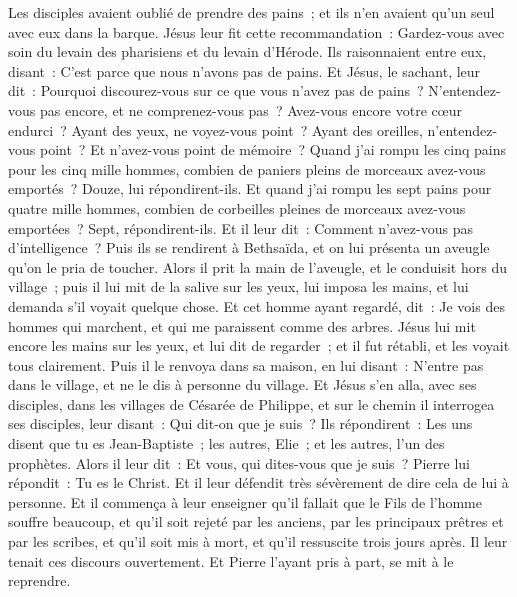 \begin{multicols}{2}
Les disciples avaient oublié de prendre des pains~; et ils n'en avaient qu'un seul avec eux dans la barque.
Jésus leur fit cette recommandation~: Gardez-vous avec soin du levain des pharisiens et du levain d'Hérode.
Ils raisonnaient entre eux, disant~: C'est parce que nous n'avons pas de pains.
Et Jésus, le sachant, leur dit~: Pourquoi discourez-vous sur ce que vous n'avez pas de pains~? N'entendez-vous pas encore, et ne comprenez-vous pas~?
Avez-vous encore votre cœur endurci~? Ayant des yeux, ne voyez-vous point~? Ayant des oreilles, n'entendez-vous point~? Et n'avez-vous point de mémoire~?
Quand j'ai rompu les cinq pains pour les cinq mille hommes, combien de paniers pleins de morceaux avez-vous emportés~? Douze, lui répondirent-ils.
Et quand j'ai rompu les sept pains pour quatre mille hommes, combien de corbeilles pleines de morceaux avez-vous emportées~? Sept, répondirent-ils.
Et il leur dit~: Comment n'avez-vous pas d'intelligence~?
Puis ils se rendirent à Bethsaïda, et on lui présenta un aveugle qu'on le pria de toucher.
Alors il prit la main de l'aveugle, et le conduisit hors du village~; puis il lui mit de la salive sur les yeux, lui imposa les mains, et lui demanda s'il voyait quelque chose.
Et cet homme ayant regardé, dit~: Je vois des hommes qui marchent, et qui me paraissent comme des arbres.
Jésus lui mit encore les mains sur les yeux, et lui dit de regarder~; et il fut rétabli, et les voyait tous clairement.
Puis il le renvoya dans sa maison, en lui disant~: N'entre pas dans le village, et ne le dis à personne du village.
Et Jésus s'en alla, avec ses disciples, dans les villages de Césarée de Philippe, et sur le chemin il interrogea ses disciples, leur disant~: Qui dit-on que je suis~?
Ils répondirent~: Les uns disent que tu es Jean-Baptiste~; les autres, Elie~; et les autres, l'un des prophètes.
Alors il leur dit~: Et vous, qui dites-vous que je suis~? Pierre lui répondit~: Tu es le Christ.
Et il leur défendit très sévèrement de dire cela de lui à personne.
Et il commença à leur enseigner qu'il fallait que le Fils de l'homme souffre beaucoup, et qu'il soit rejeté par les anciens, par les principaux prêtres et par les scribes, et qu'il soit mis à mort, et qu'il ressuscite trois jours après.
Il leur tenait ces discours ouvertement. Et Pierre l'ayant pris à part, se mit à le reprendre.

\end{multicols}
